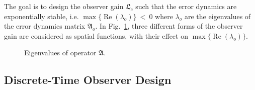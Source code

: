 The goal is to design the observer gain $\mathfrak{L}_c$ such that the error dynamics are exponentially stable, i.e. $\max\{\operatorname{Re}(\lambda_{o})\}~<~0$ where $\lambda_{o}$ are the eigenvalues of the error dynamics matrix $\mathfrak{A}_o$. In Fig.~\ref{fig:L_vs_lambda}, three different forms of the observer gain are considered as spatial functions, with their effect on $\max\{\operatorname{Re}(\lambda_{o})\}$.

\begin{figure}[!htbp]
    \centering
    
    \caption{Eigenvalues of operator $\mathfrak{A}$.}
    \label{fig:L_vs_lambda}
\end{figure}


\subsection{Discrete-Time Observer Design}

